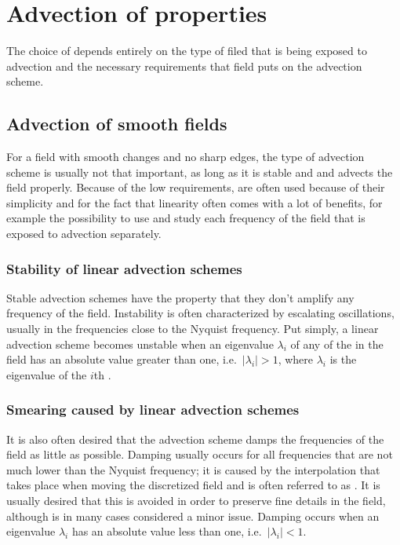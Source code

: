 \chapter{Advection of properties}

The choice of  depends entirely on the type of filed that is being exposed to advection and the necessary requirements that field puts on the advection scheme.

\section{Advection of smooth fields}

For a field with smooth changes and no sharp edges, the type of advection scheme is usually not that important, as long as it is stable and and advects the field properly. Because of the low requirements,  are often used because of their simplicity and for the fact that linearity often comes with a lot of benefits, for example the possibility to use  and study each frequency of the field that is exposed to advection separately.

\subsection{Stability of linear advection schemes}

Stable advection schemes have the property that they don't amplify any frequency of the field. Instability is often characterized by escalating oscillations, usually in the frequencies close to the Nyquist frequency. Put simply, a linear advection scheme becomes unstable when an eigenvalue $\lambda_i$ of any of the \eigenfunctions in the field has an absolute value greater than one, i.e.\ $|\lambda_i| > 1$, where $\lambda_i$ is the eigenvalue of the $i$th \eigenfunction.

\subsection{Smearing caused by linear advection schemes}

It is also often desired that the advection scheme damps the frequencies of the field as little as possible. Damping usually occurs for all frequencies that are not much lower than the Nyquist frequency; it is caused by the interpolation that takes place when moving the discretized field and is often referred to as \smearing. It is usually desired that this is avoided in order to preserve fine details in the field, although is in many cases considered a minor issue. Damping occurs when an eigenvalue $\lambda_i$ has an absolute value less than one, i.e.\ $|\lambda_i| < 1$.

